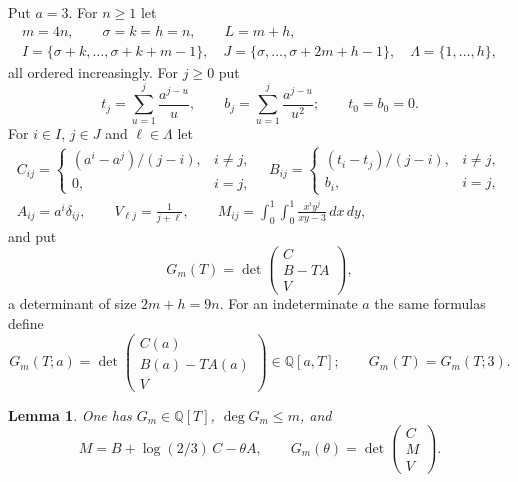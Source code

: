 \documentclass{amsart}
\newtheorem{lemma}{Lemma}[section]
\numberwithin{equation}{section}
\numberwithin{table}{section}
\begin{document}
Put $a=3$. For $n\ge1$ let
\begin{equation*}
\begin{gathered}
m=4n,\qquad \sigma=k=h=n,\qquad L=m+h,\\
I=\{\sigma+k,\ldots,\sigma+k+m-1\},\quad
J=\{\sigma,\ldots,\sigma+2m+h-1\},\quad
\Lambda=\{1,\ldots,h\},
\end{gathered}
\end{equation*}
all ordered increasingly. For $j\ge0$ put
\[
t_j=\sum_{u=1}^{j}\frac{a^{j-u}}u,\qquad
b_j=\sum_{u=1}^{j}\frac{a^{j-u}}{u^2};\qquad t_0=b_0=0.
\]
For $i\in I$, $j\in J$ and $\ell\in\Lambda$ let
\begin{equation*}
\begin{gathered}
C_{ij}=\begin{cases}(a^i-a^j)/(j-i),&i\ne j,\\0,&i=j,\end{cases}
\quad
B_{ij}=\begin{cases}(t_i-t_j)/(j-i),&i\ne j,\\b_i,&i=j,\end{cases}\\
A_{ij}=a^i\delta_{ij},\qquad V_{\ell j}=\frac1{j+\ell},\qquad
M_{ij}=\int_0^1\!\int_0^1\frac{x^iy^j}{xy-3}\,dx\,dy,
\end{gathered}
\end{equation*}
and put
\begin{equation}\label{eq:determinant}
G_m(T)=\det\begin{pmatrix}C\\B-TA\\V\end{pmatrix},
\end{equation}
a determinant of size $2m+h=9n$. For an indeterminate $a$ the same formulas
define
\[
G_m(T;a)=\det\begin{pmatrix}C(a)\\B(a)-TA(a)\\V\end{pmatrix}
\in\mathbb Q[a,T];\qquad G_m(T)=G_m(T;3).
\]

\begin{lemma}\label{lem:moment-identity}
One has $G_m\in\mathbb Q[T]$, $\deg G_m\le m$, and
\begin{equation}\label{eq:moment-identity}
M=B+\log(2/3)\,C-\theta A,\qquad
G_m(\theta)=\det\begin{pmatrix}C\\M\\V\end{pmatrix}.
\end{equation}
\end{lemma}
\end{document}
